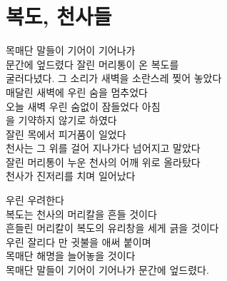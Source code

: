 \hypertarget{uxbcf5uxb3c4-uxcc9cuxc0acuxb4e4}{%

\chapter{복도, 천사들}\label{uxbcf5uxb3c4-uxcc9cuxc0acuxb4e4}}



목매단 말들이 기어이 기어나가\\

문간에 엎드렸다 잘린 머리통이 온 복도를\\

굴러다녔다. 그 소리가 새벽을 소란스레 찢어 놓았다\\

매달린 새벽에 우린 숨을 멈추었다\\

오늘 새벽 우린 숨없이 잠들었다 아침\\

을 기약하지 않기로 하였다\\

잘린 목에서 피거품이 일었다\\

천사는 그 위를 걸어 지나가다 넘어지고 말았다\\

잘린 머리통이 누운 천사의 어깨 위로 올라탔다\\

천사가 진저리를 치며 일어났다



우린 우려한다\\

복도는 천사의 머리칼을 흔들 것이다\\

흔들린 머리칼이 복도의 유리창을 세게 긁을 것이다\\

우린 잘리다 만 귓불을 애써 붙이며\\

목매단 해명을 늘어놓을 것이다\\

목매단 말들이 기어이 기어나가 문간에 엎드렸다.

